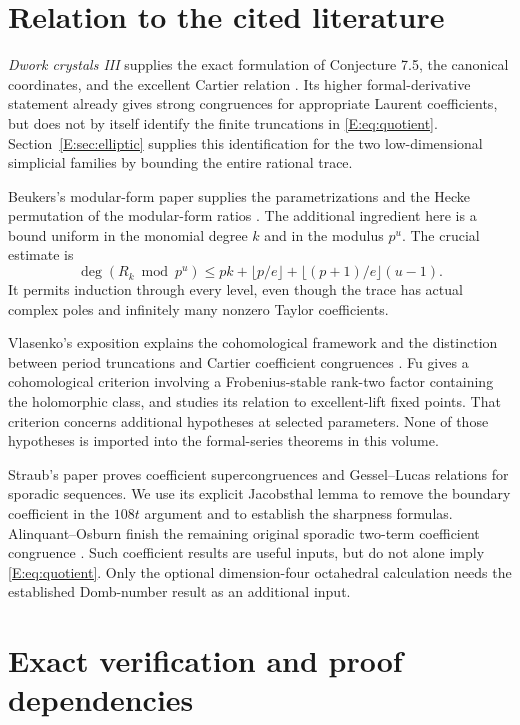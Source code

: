 \documentclass[11pt,a4paper]{article}
\theoremstyle{definition}\newtheorem{definition}[theorem]{Definition}
\theoremstyle{remark}\newtheorem{remark}[theorem]{Remark}
\numberwithin{equation}{section}
\begin{document}
\section{Relation to the cited literature}\label{E:source-main-5}

\emph{Dwork crystals III} supplies the exact formulation of Conjecture 7.5,
the canonical coordinates, and the excellent Cartier relation
\cite[Section 7 and Proposition 9.1]{BV3}.  Its higher formal-derivative
statement already gives strong congruences for appropriate Laurent
coefficients, but does not by itself identify the finite truncations in
\eqref{E:eq:quotient}.  Section~\ref{E:sec:elliptic} supplies this identification
for the two low-dimensional simplicial families by bounding the
entire rational trace.

Beukers's modular-form paper supplies the parametrizations and the Hecke
permutation of the modular-form ratios \cite[Lemmas 3.6--3.7, Appendices B--C]{Beu26}.
The additional ingredient here is a bound uniform in the monomial degree
$k$ and in the modulus $p^u$.  The crucial estimate is
\[
 \deg(R_k\bmod p^u)
 \leq pk+\lfloor p/e\rfloor+\lfloor(p+1)/e\rfloor(u-1).
\]
It permits induction through every level, even though the trace has actual
complex poles and infinitely many nonzero Taylor coefficients.

Vlasenko's exposition explains the cohomological framework and the distinction between period truncations and Cartier coefficient congruences \cite{Vl24}. Fu \cite{Fu26} gives a cohomological criterion involving a Frobenius-stable rank-two factor containing the holomorphic class, and studies its relation to excellent-lift fixed points. That criterion concerns additional hypotheses at selected parameters. None of those hypotheses is imported into the formal-series theorems in this volume.

Straub's paper proves coefficient supercongruences and Gessel--Lucas
relations for sporadic sequences.  We use its explicit Jacobsthal
lemma \cite[Lemma 2.1]{St23} to remove the boundary coefficient in
the $108t$ argument and to establish the sharpness formulas.
Alinquant--Osburn finish the remaining original sporadic two-term
coefficient congruence \cite{AO23}.  Such coefficient results are useful
inputs, but do not alone imply \eqref{E:eq:quotient}.  Only the optional
dimension-four octahedral calculation needs the established Domb-number
result \cite{OS12} as an additional input.

\section{Exact verification and proof dependencies}\label{E:source-main-6}\label{E:sec:verification}
\end{document}
